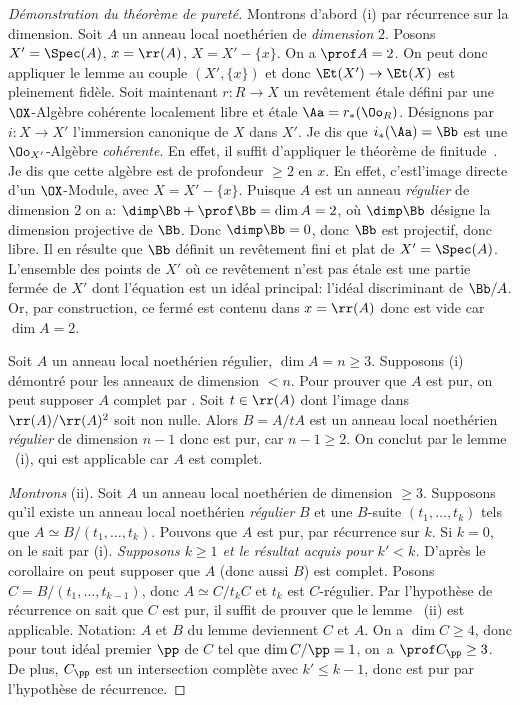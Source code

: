 \begin{proof}[D\'emonstration du th\'eor\`eme de puret\'e]
Montrons d'abord (i) par r\'ecurrence sur la dimension. Soit $A$ un anneau local noeth\'erien de \emph{dimension} $2$. Posons $X'=\Spec(A)$, $x=\rr(A)$, $X=X'-\{x\}$. On a $\prof A=2$. On peut donc appliquer le lemme  au couple $(X', \{x\})$ et donc $\Et(X')\to\Et(X)$ est pleinement fid\`ele. Soit maintenant $r\colon R\to X$ un rev\^etement \'etale d\'efini par une $\OX$-Alg\`ebre coh\'erente localement libre et \'etale $\Aa=r_\ast(\Oo_R)$. D\'esignons par $i\colon X\to X'$ l'immersion canonique de $X$ dans $X'$. Je dis que $i_\ast(\Aa)=\Bb$ est une $\Oo_{X'}$-Alg\`ebre \emph{coh\'erente}. En effet, il suffit d'appliquer le \og th\'eor\`eme de finitude\fg {}~. Je dis que cette alg\`ebre est de profondeur $\geq 2$ en $x$. En effet, c'est\pageoriginale l'image directe d'un $\OX$-Module, avec $X=X'-\{x\}$. Puisque $A$ est un anneau \emph{r\'egulier} de dimension $2$ on a: $\dimp \Bb + \prof\Bb=\dim A=2$, o\`u $\dimp\Bb$ d\'esigne la dimension projective de $\Bb$. Donc $\dimp\Bb=0$, donc $\Bb$ est projectif, donc libre. Il en r\'esulte que $\Bb$ d\'efinit un rev\^etement fini et plat de $X'=\Spec(A)$. L'ensemble des points de $X'$ o\`u ce rev\^etement n'est pas \'etale est une partie ferm\'ee de $X'$ dont l'\'equation est un id\'eal principal: l'id\'eal discriminant de $\Bb/A$. Or, par construction, ce ferm\'e est contenu dans $x=\rr(A)$ donc est vide car $\dim A=2$.

Soit $A$ un anneau local noeth\'erien r\'egulier, $\dim A=n\geq3$. Supposons (i) d\'emontr\'e pour les anneaux de dimension $<n$. Pour prouver que $A$ est pur, on peut supposer $A$ complet par . Soit $t\in\rr(A)$ dont l'image dans $\rr(A)/\rr(A)^2$ soit non nulle. Alors $B=A/tA$ est un anneau local noeth\'erien \emph{r\'egulier} de dimension $n-1$ donc est pur, car $n-1\geq2$. On conclut par le lemme ~(i), qui est applicable car $A$ est complet.

\emph{Montrons} (ii). Soit $A$ un anneau local noeth\'erien de dimension $\geq 3$. Supposons qu'il existe un anneau local noeth\'erien \emph{r\'egulier} $B$ et une $B$-suite $(t_1, \ldots, t_k)$ tels que $A\simeq B/(t_1, \ldots, t_k)$. Pouvons que $A$ est pur, par r\'ecurrence sur $k$. Si $k=0$, on le sait par (i). \emph{Supposons $k\geq1$ et le r\'esultat acquis pour $k'<k$.} D'apr\`es le corollaire  on peut supposer que $A$ (donc aussi $B$) est complet. Posons $C=B/(t_1, \ldots, t_{k-1})$, donc $A\simeq C/t_kC$ et $t_k$ est $C$-r\'egulier. Par l'hypoth\`ese de r\'ecurrence on sait que $C$ est pur, il suffit de prouver que le lemme ~(ii) est applicable. Notation: $A$ et $B$ du lemme deviennent $C$ et $A$. On a $\dim C\geq4$, donc pour tout id\'eal premier $\pp$ de $C$ tel que $\dim C/\pp=1$, on~a $\prof C_\pp\geq3$. De plus, $C_\pp$ est un intersection compl\`ete avec $k'\leq k-1$, donc est pur par l'hypoth\`ese de r\'ecurrence.
\end{proof}

